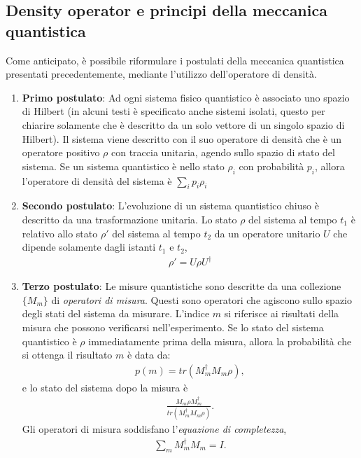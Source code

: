 \subsection{Density operator e principi della meccanica quantistica}
Come anticipato, è possibile riformulare i postulati della meccanica quantistica presentati precedentemente, mediante l'utilizzo dell'operatore di densità. 

\begin{enumerate}
    \item \textbf{Primo postulato}: Ad ogni sistema fisico quantistico è associato uno spazio di Hilbert (in alcuni testi è specificato anche sistemi isolati, questo per chiarire solamente che è descritto da un solo vettore di un singolo spazio di Hilbert). Il sistema viene descritto con il suo operatore di densità che è un operatore positivo \(\rho\) con traccia unitaria, agendo sullo spazio di stato del sistema. Se un sistema quantistico è nello stato \(\rho_i\) con probabilità \(p_i\), allora l'operatore di densità del sistema è \(\sum_{i}p_i \rho_i\)
    
    \item \textbf{Secondo postulato}: L'evoluzione di un sistema quantistico chiuso è descritto da una trasformazione unitaria. Lo stato \(\rho\) del sistema al tempo \(t_1\) è relativo allo stato \(\rho'\) del sistema al tempo \(t_2\) da un operatore unitario \(U\) che dipende solamente dagli istanti \(t_1\) e \(t_2\),
    \begin{gather*}
        \rho'=U\rho U^\dagger
    \end{gather*}

    \item \textbf{Terzo postulato}: Le misure quantistiche sono descritte da una
    collezione $\{M_m\}$ di \emph{operatori di misura}. Questi sono operatori che agiscono sullo spazio degli stati del sistema da misurare. L'indice $m$ si riferisce ai risultati della misura che possono verificarsi nell'esperimento. Se lo stato del sistema quantistico è $\rho$ immediatamente prima della misura, allora la probabilità che si ottenga il risultato $m$ è
    data da:
    \begin{gather*}
    p(m) = tr\left(M_m^\dagger M_m \rho\right),
    \end{gather*}
    e lo stato del sistema dopo la misura è
    \begin{gather*}
    \frac{M_m \rho M_m^\dagger}{tr\left(M_m^\dagger M_m \rho\right)}.
    \end{gather*}
    Gli operatori di misura soddisfano l'\emph{equazione di completezza},
    \begin{gather*}
    \sum_m M_m^\dagger M_m = I.
    \end{gather*}


\end{enumerate}
